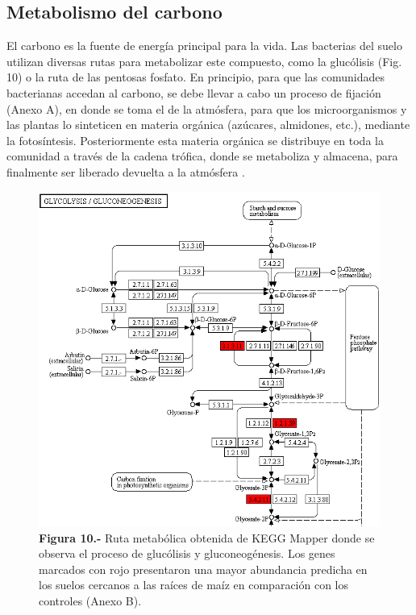 \documentclass[12pt,letterpaper,oneside]{report}
\begin{document}
\subsection{Metabolismo del carbono}
El carbono es la fuente de energía principal para la vida. Las bacterias del suelo utilizan diversas rutas para metabolizar este compuesto, como la glucólisis (Fig. 10) o la ruta de las pentosas fosfato. En principio, para que las comunidades bacterianas accedan al carbono, se debe llevar a cabo un proceso de fijación (Anexo A), en donde se toma el  de la atmósfera, para que los microorganismos y las plantas lo sinteticen en materia orgánica (azúcares, almidones, etc.), mediante la fotosíntesis. Posteriormente esta materia orgánica se distribuye en toda la comunidad a través de la cadena trófica, donde se metaboliza y almacena, para finalmente ser liberado devuelta a la atmósfera \autocite{Gougoulias2014}.
\begin{figure}[!h]
\centering
\includegraphics[width=15.59cm]{figuras/IMG_11}
\caption*{\textbf{Figura 10.-} Ruta metabólica obtenida de KEGG Mapper donde se observa el proceso de glucólisis y gluconeogénesis. Los genes marcados con rojo presentaron una mayor abundancia predicha en los suelos cercanos a las raíces de maíz en comparación con los controles (Anexo B).}
\label{Figura 11}
\end{figure}
\end{document}
